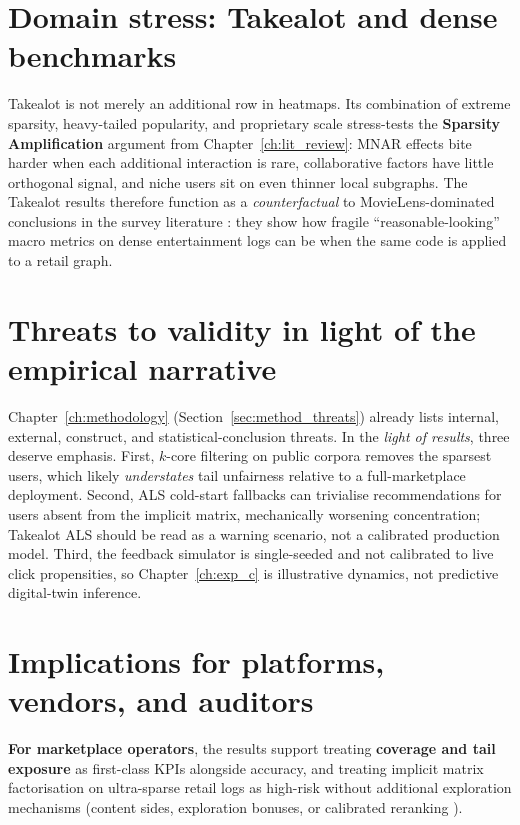 \section{Domain stress: Takealot and dense benchmarks}
Takealot is not merely an additional row in heatmaps. Its combination of extreme sparsity, heavy-tailed popularity, and proprietary scale stress-tests the \textbf{Sparsity Amplification} argument from Chapter~\ref{ch:lit_review}: MNAR effects bite harder when each additional interaction is rare, collaborative factors have little orthogonal signal, and niche users sit on even thinner local subgraphs. The Takealot results therefore function as a \emph{counterfactual} to MovieLens-dominated conclusions in the survey literature \citep{klimashevskaia2024survey}: they show how fragile ``reasonable-looking'' macro metrics on dense entertainment logs can be when the same code is applied to a retail graph.

\section{Threats to validity in light of the empirical narrative}
Chapter~\ref{ch:methodology} (Section~\ref{sec:method_threats}) already lists internal, external, construct, and statistical-conclusion threats. In the \emph{light of results}, three deserve emphasis. First, $k$-core filtering on public corpora removes the sparsest users, which likely \emph{understates} tail unfairness relative to a full-marketplace deployment. Second, ALS cold-start fallbacks can trivialise recommendations for users absent from the implicit matrix, mechanically worsening concentration; Takealot ALS should be read as a warning scenario, not a calibrated production model. Third, the feedback simulator is single-seeded and not calibrated to live click propensities, so Chapter~\ref{ch:exp_c} is illustrative dynamics, not predictive digital-twin inference.

\section{Implications for platforms, vendors, and auditors}
\textbf{For marketplace operators}, the results support treating \textbf{coverage and tail exposure} as first-class KPIs alongside accuracy, and treating implicit matrix factorisation on ultra-sparse retail logs as high-risk without additional exploration mechanisms (content sides, exploration bonuses, or calibrated reranking \citep{abdollahpouri2019managing, steck2018calibrated}).

